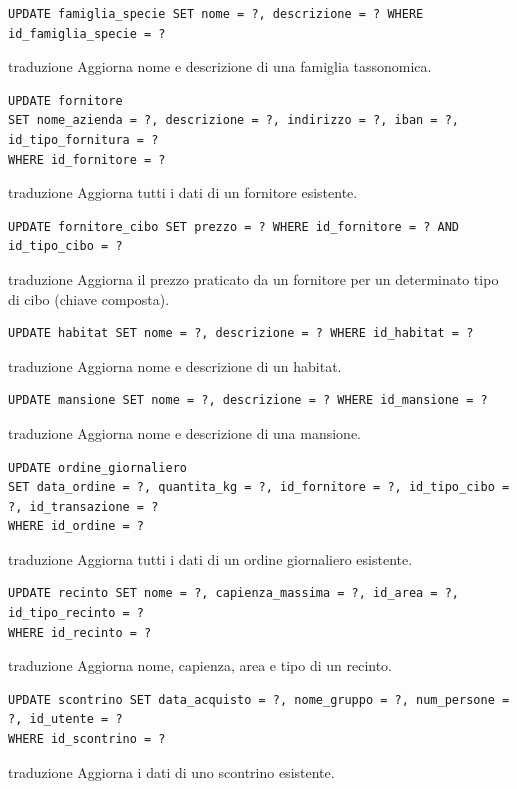 \documentclass[12pt,a4paper]{report}
\begin{document}
\begin{lstlisting}[style=sqlstyle]
UPDATE famiglia_specie SET nome = ?, descrizione = ? WHERE id_famiglia_specie = ?
\end{lstlisting}
traduzione {Aggiorna nome e descrizione di una famiglia tassonomica.}

\begin{lstlisting}[style=sqlstyle]
UPDATE fornitore
SET nome_azienda = ?, descrizione = ?, indirizzo = ?, iban = ?, id_tipo_fornitura = ?
WHERE id_fornitore = ?
\end{lstlisting}
traduzione {Aggiorna tutti i dati di un fornitore esistente.}

\begin{lstlisting}[style=sqlstyle]
UPDATE fornitore_cibo SET prezzo = ? WHERE id_fornitore = ? AND id_tipo_cibo = ?
\end{lstlisting}
traduzione {Aggiorna il prezzo praticato da un fornitore per un determinato tipo di cibo (chiave composta).}

\begin{lstlisting}[style=sqlstyle]
UPDATE habitat SET nome = ?, descrizione = ? WHERE id_habitat = ?
\end{lstlisting}
traduzione {Aggiorna nome e descrizione di un habitat.}

\begin{lstlisting}[style=sqlstyle]
UPDATE mansione SET nome = ?, descrizione = ? WHERE id_mansione = ?
\end{lstlisting}
traduzione {Aggiorna nome e descrizione di una mansione.}

\begin{lstlisting}[style=sqlstyle]
UPDATE ordine_giornaliero
SET data_ordine = ?, quantita_kg = ?, id_fornitore = ?, id_tipo_cibo = ?, id_transazione = ?
WHERE id_ordine = ?
\end{lstlisting}
traduzione {Aggiorna tutti i dati di un ordine giornaliero esistente.}

\begin{lstlisting}[style=sqlstyle]
UPDATE recinto SET nome = ?, capienza_massima = ?, id_area = ?, id_tipo_recinto = ?
WHERE id_recinto = ?
\end{lstlisting}
traduzione {Aggiorna nome, capienza, area e tipo di un recinto.}

\begin{lstlisting}[style=sqlstyle]
UPDATE scontrino SET data_acquisto = ?, nome_gruppo = ?, num_persone = ?, id_utente = ?
WHERE id_scontrino = ?
\end{lstlisting}
traduzione {Aggiorna i dati di uno scontrino esistente.}
\end{document}
